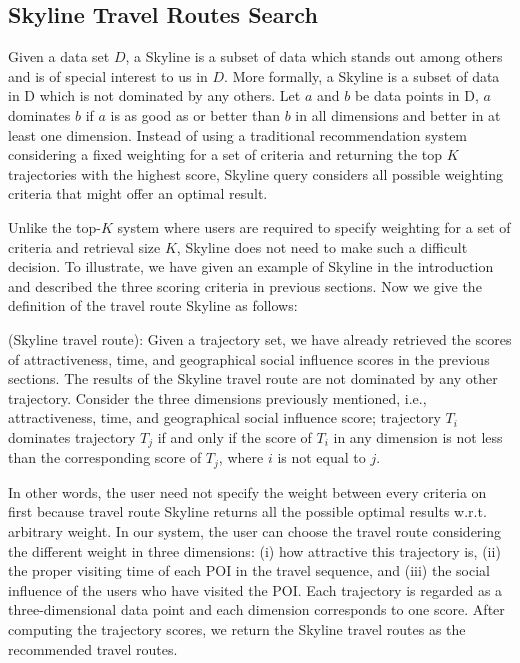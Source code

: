 \subsection{Skyline Travel Routes Search}
 Given a data set $D$, a Skyline is a subset of data which stands out among others and is of special interest to us in $D$. More formally, a Skyline is a subset of data in D which is not dominated by any others. Let $a$ and $b$ be data points in D, $a$ dominates $b$ if $a$ is as good as or better than $b$ in all dimensions and better in at least one dimension. Instead of using a traditional recommendation system considering a fixed weighting for a set of criteria and returning the top $K$ trajectories with the highest score, Skyline query considers all possible weighting criteria that might offer an optimal result. 

 Unlike the top-$K$ system where users are required to specify weighting for a set of criteria and retrieval size $K$, Skyline does not need to make such a difficult decision. To illustrate, we have given an example of Skyline in the introduction and described the three scoring criteria in previous sections. Now we give the definition of the travel route Skyline as follows:

\begin{defi}(Skyline travel route):
Given a trajectory set, we have already retrieved the scores of attractiveness, time, and geographical social influence scores in the previous sections. The results of the Skyline travel route are not dominated by any other trajectory. Consider the three dimensions previously mentioned, i.e., attractiveness, time, and geographical social influence score; trajectory $T_{i}$ dominates trajectory $T_{j}$ if and only if the score of $T_{i}$ in any dimension is not less than the corresponding score of $T_{j}$, where $i$ is not equal to $j$.
\end{defi}

In other words, the user need not specify the weight between every criteria on first because travel route Skyline returns all the possible optimal results w.r.t. arbitrary weight. In our system, the user can choose the travel route considering the different weight in three dimensions: (i) how attractive this trajectory is, (ii) the proper visiting time of each POI in the travel sequence, and (iii) the social influence of the users who have visited the POI. Each trajectory is regarded as a three-dimensional data point and each dimension corresponds to one score. After computing the trajectory scores, we return the Skyline travel routes as the recommended travel routes.

